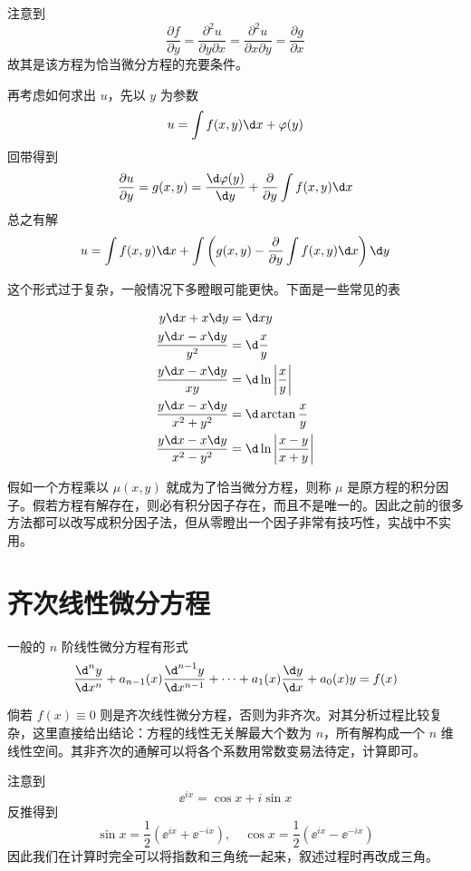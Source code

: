 注意到
\[ \frac{\partial f}{\partial y} = \frac{\partial^2 u}{\partial y \partial x} = \frac{\partial^2 u}{\partial x \partial y} = \frac{\partial g}{\partial x} \]
故其是该方程为恰当微分方程的充要条件。

再考虑如何求出 $u$，先以 $y$ 为参数
\[ u = \int f(x, y) \d x + \varphi(y) \]
回带得到
\[ \frac{\partial u}{\partial y} = g(x, y) = \frac{\d \varphi(y)}{\d y} + \frac{\partial}{\partial y}\int f(x, y) \d x \]
总之有解
\[ u = \int f(x, y) \d x + \int \left( g(x, y) - \frac{\partial}{\partial y}\int f(x, y) \d x  \right) \d y \]

这个形式过于复杂，一般情况下多瞪眼可能更快。下面是一些常见的表

\[ \begin{aligned}
		y \d x + x \d y                   & = \d x y                              \\
		\frac{y \d x - x \d y}{y^2}       & = \d \frac{x}{y}                      \\
		\frac{y \d x - x \d y}{xy}        & = \d \ln\left|\frac{x}{y}\right|      \\
		\frac{y \d x - x \d y}{x^2 + y^2} & = \d \arctan \frac{x}{y}              \\
		\frac{y \d x - x \d y}{x^2 - y^2} & = \d \ln\left| \frac{x-y}{x+y}\right| \\
	\end{aligned} \]

假如一个方程乘以 $\mu(x, y)$ 就成为了恰当微分方程，则称 $\mu$ 是原方程的积分因子。假若方程有解存在，则必有积分因子存在，而且不是唯一的。因此之前的很多方法都可以改写成积分因子法，但从零瞪出一个因子非常有技巧性，实战中不实用。

\section{齐次线性微分方程}

一般的 $n$ 阶线性微分方程有形式
\[ \frac{\d^n y}{\d x^n} + a_{n-1}(x) \frac{\d^{n-1} y}{\d x^{n-1}} + \cdots + a_1(x) \frac{\d y}{\d x} + a_0(x) y = f(x) \]

倘若 $f(x) \equiv 0$ 则是齐次线性微分方程，否则为非齐次。对其分析过程比较复杂，这里直接给出结论：方程的线性无关解最大个数为 $n$，所有解构成一个 $n$ 维线性空间。其非齐次的通解可以将各个系数用常数变易法待定，计算即可。

注意到
\[ \ee^{i x} = \cos x + i \sin x \]
反推得到
\[ \sin x = \frac{1}{2}(\ee^{i x} + \ee^{-i x}), \quad \cos x = \frac{1}{2} (\ee^{ix} - \ee^{-ix}) \]
因此我们在计算时完全可以将指数和三角统一起来，叙述过程时再改成三角。

